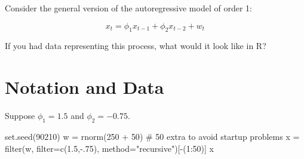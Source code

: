\documentclass[
  letterpaper,
  DIV=11,
  numbers=noendperiod]{scrreprt}
\newenvironment{Shaded}{\begin{snugshade}}{\end{snugshade}}
\newcommand{\AttributeTok}[1]{\textcolor[rgb]{0.40,0.45,0.13}{#1}}
\newcommand{\CommentTok}[1]{\textcolor[rgb]{0.37,0.37,0.37}{#1}}
\newcommand{\DecValTok}[1]{\textcolor[rgb]{0.68,0.00,0.00}{#1}}
\newcommand{\FloatTok}[1]{\textcolor[rgb]{0.68,0.00,0.00}{#1}}
\newcommand{\FunctionTok}[1]{\textcolor[rgb]{0.28,0.35,0.67}{#1}}
\newcommand{\NormalTok}[1]{\textcolor[rgb]{0.00,0.23,0.31}{#1}}
\newcommand{\OtherTok}[1]{\textcolor[rgb]{0.00,0.23,0.31}{#1}}
\newcommand{\SpecialCharTok}[1]{\textcolor[rgb]{0.37,0.37,0.37}{#1}}
\newcommand{\StringTok}[1]{\textcolor[rgb]{0.13,0.47,0.30}{#1}}
\begin{document}
Consider the general version of the autoregressive model of order 1:

\[
x_t = \phi_1x_{t-1} + \phi_2x_{t-2} + w_t
\]

If you had data representing this process, what would it look like in R?

\section{Notation and Data}\label{notation-and-data-1}

Suppose \(\phi_1 = 1.5\) and \(\phi_2 = -0.75\).

\begin{Shaded}
\begin{Highlighting}[]
\FunctionTok{set.seed}\NormalTok{(}\DecValTok{90210}\NormalTok{)}
\NormalTok{w }\OtherTok{=} \FunctionTok{rnorm}\NormalTok{(}\DecValTok{250} \SpecialCharTok{+} \DecValTok{50}\NormalTok{) }\CommentTok{\# 50 extra to avoid startup problems}
\NormalTok{x }\OtherTok{=} \FunctionTok{filter}\NormalTok{(w, }\AttributeTok{filter=}\FunctionTok{c}\NormalTok{(}\FloatTok{1.5}\NormalTok{,}\SpecialCharTok{{-}}\NormalTok{.}\DecValTok{75}\NormalTok{), }\AttributeTok{method=}\StringTok{"recursive"}\NormalTok{)[}\SpecialCharTok{{-}}\NormalTok{(}\DecValTok{1}\SpecialCharTok{:}\DecValTok{50}\NormalTok{)]}
\NormalTok{x}
\end{Highlighting}
\end{Shaded}
\end{document}
